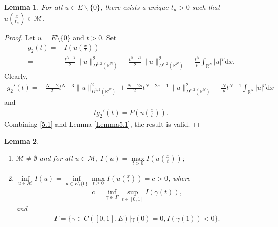 \documentclass[12pt,a4paper,reqno]{amsart}
\numberwithin{equation}{section}
\newtheorem{lemma}{Lemma}[section]
\begin{document}
\begin{lemma}\label{Lemma5.2}
For all
$u\in E\backslash\{0\}$,
there exists a unique
$t_{u}> 0$
such that
$u(\frac{x}{t_{u}})\in \mathcal{M}$.
\end{lemma}
\begin{proof}
Let
$u=E\setminus\{0\}$ and $t>0$. Set
\begin{equation*}
\begin{aligned}
g_{2}(t)
=&
I\left(u\left(\frac{x}{t}\right)\right)\\
=&
\frac{t^{N-2}}{2}
\|u\|_{D^{1,2}(\mathbb{R}^{N})}^{2}
+
\frac{t^{N-2s}}{2}
\|u\|_{D^{s,2}(\mathbb{R}^{N})}^{2}
-
\frac{t^{N}}{p}
\int_{\mathbb{R}^{N}}
|u|^{p}
\mathrm{d}x.
\end{aligned}
\end{equation*}
Clearly,
\begin{equation*}
\begin{aligned}
g_{2}'(t)
=&
\frac{N-2}{2}t^{N-3}
\|u\|_{D^{1,2}(\mathbb{R}^{N})}^{2}
+
\frac{N-2s}{2}
t^{N-2s-1}
\|u\|_{D^{s,2}(\mathbb{R}^{N})}^{2}
-
\frac{N}{p}t^{N-1}
\int_{\mathbb{R}^{N}}
|u|^{p}
\mathrm{d}x
\end{aligned}
\end{equation*}
and
\begin{equation}\label{5.1}
\begin{aligned}
tg_{2}'(t)=P\left(u\left(\frac{x}{t}\right)\right).
\end{aligned}
\end{equation}
Combining \eqref{5.1} and Lemma \ref{Lemma5.1},
the result is valid.
\end{proof}


\begin{lemma}\label{Lemma5.3}
\begin{enumerate}
\item [(i)]
$\mathcal{M}\not=\emptyset$
and for all
$u\in \mathcal{M}$,
$I(u)=\max\limits_{t>0}I\left(u\left(\frac{x}{t}\right)\right)$;

\item [(ii)]
$\inf\limits_{u\in \mathcal{M}}I(u)=
\inf\limits_{u\in E\setminus\{0\}}\max
\limits_{t\geqslant0}
I\left(u\left(\frac{x}{t}\right)\right)=c>0$, where
\begin{equation*}
\begin{aligned}
c=\inf\limits_{\gamma\in \Gamma}\sup\limits_{t\in[0, 1]}I(\gamma (t)),
\end{aligned}
\end{equation*}
and
\begin{equation*}
\begin{aligned}
\Gamma=\{\gamma\in C\left([0, 1], E\right)| \gamma(0)=0, I(\gamma (1))<0\}.
\end{aligned}
\end{equation*}

\end{enumerate}
	
\end{lemma}
\end{document}
